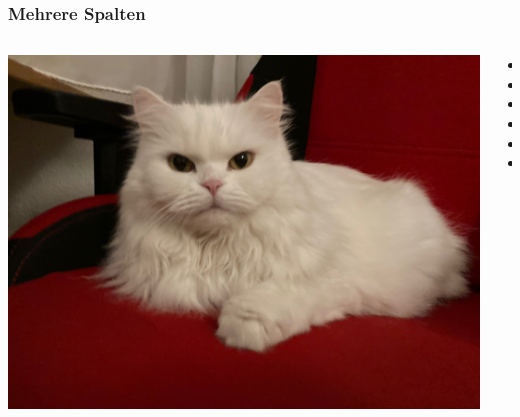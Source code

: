 \documentclass[12pt,ngerman]{beamer}
\begin{document}
\begin{frame}
\frametitle{Mehrere Spalten}

\begin{columns}
\begin{column}{0.66\textwidth}
\includegraphics[width=\textwidth]{Katze}
\end{column}
\begin{column}{0.33\textwidth}
\begin{itemize}
	\item 
	\item 
	\item 
	\item 
	\item 
	\item 
\end{itemize}


\end{column}
\end{columns}

\end{frame}
\end{document}
